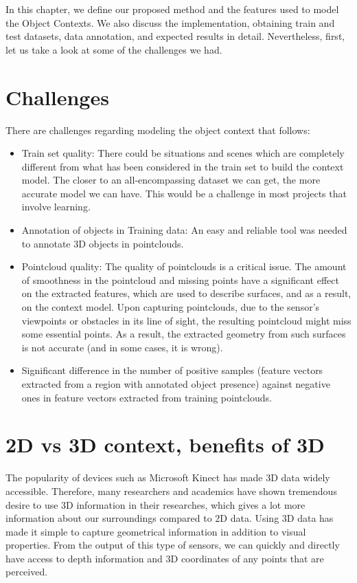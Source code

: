In this chapter, we define our proposed method and the features used to model the Object Contexts. We also discuss the implementation, obtaining train and test datasets, data annotation, and expected results in detail. Nevertheless, first, let us take a look at some of the challenges we had.

\section{Challenges}
\label{Challenges.sec}

There are challenges regarding modeling the object context that follows:

\begin{itemize}

 \item Train set quality: There could be situations and scenes which are completely different from what has been considered in the train set to build the context model. The closer to an all-encompassing dataset we can get, the more accurate model we can have. This would be a challenge in most projects that involve learning.
	
 \item Annotation of objects in Training data: An easy and reliable tool was needed to annotate 3D objects in pointclouds.
	
 \item Pointcloud quality: The quality of pointclouds is a critical issue. The amount of smoothness in the pointcloud and missing points have a 
 significant effect on the extracted features, which are used to describe surfaces, and as a result, on the context model. 
 Upon capturing pointclouds, due to the sensor's viewpoints or obstacles in its line of sight, the resulting pointcloud might miss some essential points. As a result, the extracted geometry from such surfaces is not accurate (and in some cases, it is wrong).
 
 \item Significant difference in the number of positive samples (feature vectors extracted from a region with annotated object presence) against negative ones in feature vectors extracted from training pointclouds.
 
\end{itemize}


\section{2D vs 3D context, benefits of 3D}
The popularity of devices such as Microsoft Kinect has made 3D data widely accessible. 
Therefore, many researchers and academics have shown tremendous desire to use 3D information in their researches, 
which gives a lot more information about our surroundings compared to 2D data. 
Using 3D data has made it simple to capture geometrical information in addition to visual properties. 
From the output of this type of sensors, we can quickly and directly have access to depth information and 3D 
coordinates of any points that are perceived.

